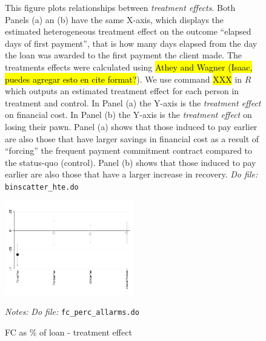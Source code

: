 \documentclass[11pt]{article}
\begin{document}
\begin{figure}[H]
\begin{center}
    \end{center}
       \scriptsize 
       This figure plots relationships between \textit{treatment effects}. Both Panels (a) an (b) have the same X-axis, which displays the estimated heterogeneous treatment effect on the outcome ``elapsed days of first payment'', that is how many days elapsed from the day the loan was awarded to the first payment the client made. The treatments effects were calculated using \hl{Athey and Wagner (Isaac, puedes agregar esto en cite format?}). We use command \hl{XXX} in $R$ which outputs an estimated treatment effect for each person in treatment and control. In Panel (a) the Y-axis is the \textit{treatment effect} on financial cost. In Panel (b) the Y-axis is the \textit{treatment effect} on losing their pawn. Panel (a) shows that those induced to pay earlier are also those that have larger savings in financial cost as a result of ``forcing'' the frequent payment commitment contract compared to the status-quo (control). Panel (b) shows that those induced to pay earlier are also those that have a larger increase in recovery.
      \textit{Do file: }  \texttt{binscatter\_hte.do}
\end{figure}




\begin{figure}[H]
        \caption{FC as \% of loan - treatment effect}
    \label{fc_perc}
    \begin{center}
        \centering
        \includegraphics[width=0.50\textwidth]{Figuras/fc_perc_te_allarms.pdf}
    \end{center}
    \footnotesize \textit{Notes: } 
     \footnotesize{ \textit{Do file: }  \texttt{fc\_perc\_allarms.do}}
\end{figure}
\end{document}
